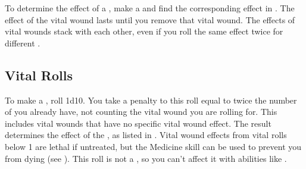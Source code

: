     To determine the effect of a , make a  and find the corresponding effect in .
    The effect of the vital wound lasts until you remove that vital wound.
    The effects of vital wounds stack with each other, even if you roll the same effect twice for different .

    \subsection{Vital Rolls}\label{Vital Rolls}
        To make a , roll 1d10.
        You take a penalty to this roll equal to twice the number of  you already have, not counting the vital wound you are rolling for.
        This includes vital wounds that have no specific vital wound effect.
        The result determines the effect of the , as listed in .
        Vital wound effects from vital rolls below 1 are lethal if untreated, but the Medicine skill can be used to prevent you from dying (see ).
        This roll is not a , so you can't affect it with abilities like .

